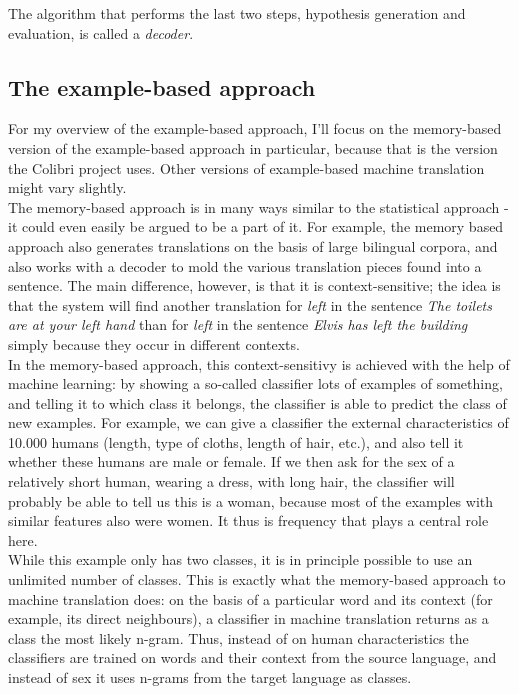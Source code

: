 \documentclass[12pt]{article}
\begin{document}
The algorithm that performs the last two steps, hypothesis generation and evaluation, is called a \emph{decoder}.

\subsection{The example-based approach}

For my overview of the example-based approach, I'll focus on the memory-based version of the example-based approach in particular, because that is the version the Colibri project uses. Other versions of example-based machine translation might vary slightly. \\\indent
The memory-based approach is in many ways similar to the statistical approach - it could even easily be argued to be a part of it. For example, the memory based approach also generates translations on the basis of large bilingual corpora, and also works with a decoder to mold the various translation pieces found into a sentence. The main difference, however, is that it is context-sensitive; the idea is that the system will find another translation for \emph{left} in the sentence \emph{The toilets are at your left hand} than for \emph{left} in the sentence \emph{Elvis has left the building} simply because they occur in different contexts. \\\indent
In the memory-based approach, this context-sensitivy is achieved with the help of machine learning: by showing a so-called classifier lots of examples of something, and telling it to which class it belongs, the classifier is able to predict the class of new examples. For example, we can give a classifier the external characteristics of 10.000 humans (length, type of cloths, length of hair, etc.), and also tell it whether these humans are male or female. If we then ask for the sex of a relatively short human, wearing a dress, with long hair, the classifier will probably be able to tell us this is a woman, because most of the examples with similar features also were women. It thus is frequency that plays a central role here.\\\indent
While this example only has two classes, it is in principle possible to use an unlimited number of classes. This is exactly what the memory-based approach to machine translation does: on the basis of a particular word and its context (for example, its direct neighbours), a classifier in machine translation returns as a class the most likely n-gram. Thus, instead of on human characteristics the classifiers are trained on words and their context from the source language, and instead of sex it uses n-grams from the target language as classes. \\\indent
\end{document}
